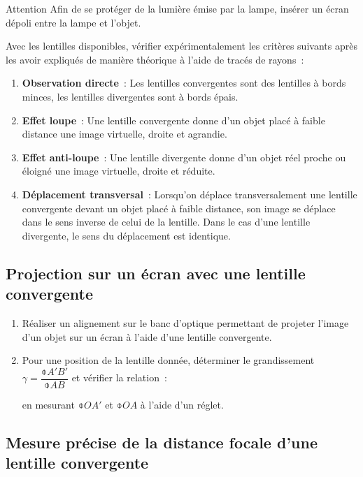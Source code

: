 \documentclass[a4paper, 12pt, final, garamond]{book}
\begin{document}
\begin{instruc}{Attention}
    Afin de se protéger de la lumière émise par la lampe, insérer un écran
    dépoli entre la lampe et l'objet.
\end{instruc}

Avec les lentilles disponibles, vérifier expérimentalement les critères suivants
après les avoir expliqués de manière théorique à l'aide de tracés de rayons~:

\begin{enumerate}
    \item \textbf{Observation directe}~: Les lentilles convergentes sont des
        lentilles à bords minces, les lentilles divergentes sont à bords épais.
    \item \textbf{Effet loupe}~: Une lentille convergente donne d'un objet placé
        à faible distance une image virtuelle, droite et agrandie.
    \item \textbf{Effet anti-loupe}~: Une lentille divergente donne d'un objet
        réel proche ou éloigné une image virtuelle, droite et réduite.
    \item \textbf{Déplacement transversal}~: Lorsqu'on déplace transversalement
        une lentille convergente devant un objet placé à faible distance, son
        image se déplace dans le sens inverse de celui de la lentille.  Dans le
        cas d'une lentille divergente, le sens du déplacement est identique.
\end{enumerate}

\subsection{Projection sur un écran avec une lentille convergente}

\begin{enumerate}
    \item Réaliser un alignement sur le banc d'optique permettant de projeter
        l'image d'un objet sur un écran à l'aide d'une lentille convergente.
    \item Pour une position de la lentille donnée, déterminer le grandissement
        $\gamma=\dfrac{\obar{A'B'}}{\obar{AB}}$ et vérifier la relation~:


        en mesurant $\obar{OA'}$ et $\obar{OA}$ à l'aide d'un réglet.
\end{enumerate}

\subsection{Mesure précise de la distance focale d'une lentille convergente}
\end{document}
